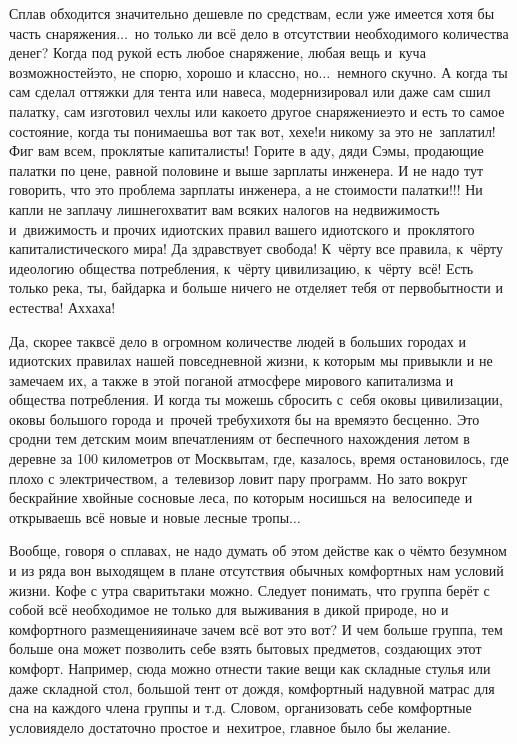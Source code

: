 Сплав обходится значительно дешевле по средствам, если уже имеется хотя бы часть снаряжения$\ldots$~но только ли всё дело в отсутствии необходимого количества денег? Когда под рукой есть любое снаряжение, любая вещь и~куча возможностей\mdash это, не спорю, хорошо и классно, но$\ldots$~немного скучно. А когда ты сам сделал оттяжки для тента или навеса, модернизировал или даже сам сшил палатку, сам изготовил чехлы или какое\sdash то другое снаряжение\mdash это и есть то самое состояние, когда ты понимаешь\mdash а вот так вот, хе\sdash хе!\mdash и никому за это не~заплатил! Фиг вам всем, проклятые капиталисты! Горите в аду, дяди Сэмы, продающие палатки по цене, равной половине и выше зарплаты инженера. И не надо тут говорить, что это проблема зарплаты инженера, а не стоимости палатки!!! Ни капли не заплачу лишнего\mdash хватит вам всяких налогов на недвижимость и~движимость и прочих идиотских правил вашего идиотского и~проклятого капиталистического мира! Да здравствует свобода! К~чёрту все правила, к~чёрту идеологию общества потребления, к~чёрту цивилизацию, к~чёрту~всё! Есть только река, ты, байдарка и больше ничего не отделяет тебя от первобытности и естества! Ах\sdash ха\sdash ха!

Да, скорее так\mdash всё дело в огромном количестве людей в больших городах и идиотских правилах нашей повседневной жизни, к которым мы привыкли и не замечаем их, а также в этой поганой атмосфере мирового капитализма и общества потребления. И когда ты можешь сбросить с~себя оковы цивилизации, оковы большого города и~прочей требухи\mdash хотя бы на время\mdash это бесценно. Это сродни тем детским моим впечатлениям от беспечного нахождения летом в деревне за 100 километров от Москвы\mdash там, где, казалось, время остановилось, где плохо с электричеством, а~телевизор ловит пару программ. Но зато вокруг бескрайние хвойные сосновые леса, по которым носишься на~велосипеде и открываешь всё новые и новые лесные тропы$\ldots$ 

Вообще, говоря о сплавах, не надо думать об этом действе как о чём\sdash то безумном и из ряда вон выходящем в плане отсутствия обычных комфортных нам условий жизни. Кофе с утра сварить\sdash таки можно. Следует понимать, что группа берёт с собой всё необходимое не только для выживания в дикой природе, но и комфортного размещения\mdash иначе зачем всё вот это вот? И чем больше группа, тем больше она может позволить себе взять бытовых предметов, создающих этот комфорт. Например, сюда можно отнести такие вещи как складные стулья или даже складной стол, большой тент от дождя, комфортный надувной матрас для сна на каждого члена группы и т.д. Словом, организовать себе комфортные условия\mdash дело достаточно простое и~нехитрое, главное было бы желание. 

